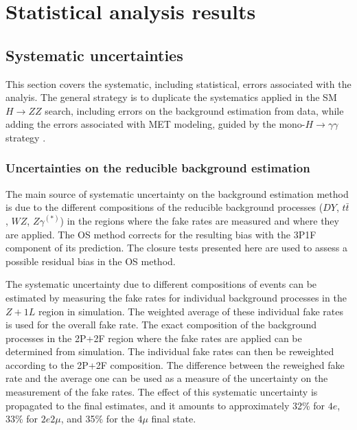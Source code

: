\chapter{Statistical analysis results}

\section{Systematic uncertainties}

This section covers the systematic, including statistical, errors associated with the analyis. The general strategy is to duplicate the systematics applied in the SM $H\rightarrow ZZ$ search, including errors on the background estimation from data, while adding the errors associated with MET modeling, guided by the mono-$H \rightarrow \gamma\gamma$ strategy \cite{CMS-AN-15-203}. 

\subsection{Uncertainties on the reducible background estimation} %
\label{sec:zxUncert}


The main source of systematic uncertainty on the background estimation method is due to the different compositions of the reducible background processes ($DY$, $t \bar{t}$, $WZ$, $Z\gamma^{(*)}$) in the regions where the fake rates are measured and where they are applied.
The OS method corrects for the resulting bias with the 3P1F component of its prediction.
The closure tests presented here are used to assess a possible residual bias in the OS method.

The systematic uncertainty due to different compositions of events can be estimated by measuring the fake rates for individual background processes in the $Z+1L$ region in simulation. The weighted average of these individual fake rates is used for the overall fake rate. The exact composition of the background processes in the 2P+2F region where the fake rates are applied can be determined from simulation. The individual fake rates can then be reweighted according to the 2P+2F composition. The difference between the reweighed fake rate and the average one can be used as a measure of the uncertainty on the measurement of the fake rates. The effect of this systematic uncertainty is propagated to the final estimates, and it amounts to approximately 32\% for $4e$, 33\% for $2e2\mu$, and 35\% for the $4\mu$ final state. 


